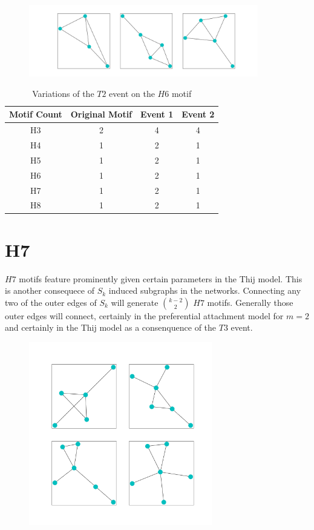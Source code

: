 \begin{figure}[!ht]
    \includegraphics[width=10cm]{Images/H6_evolution.png}
    \centering
\end{figure}
\FloatBarrier

\begin{table}
    \centering
    \begin{tabular}{||c c c c||} 
    \hline
    Motif Count & Original Motif & Event 1 & Event 2\\ [0.5ex] 
    \hline\hline
    H3 & 2 & 4 & 4\\ 
    \hline
    H4 & 1 & 2 & 1\\
    \hline
    H5 & 1 & 2 & 1\\
    \hline
    H6 & 1 & 2 & 1\\
    \hline
    H7 & 1 & 2 & 1\\
    \hline
    H8 & 1 & 2 & 1\\
    \hline
   \end{tabular}
   \caption{Variations of the $T2$ event on the $H6$ motif}
    \label{table:4}
\end{table}

\section{H7}
$H7$ motifs feature prominently given certain parameters in the Thij model. This is another consequece
of $S_k$ induced subgraphs in the networks. Connecting any two of the outer edges of $S_k$
will generate ${k-2 \choose 2}$ $H7$ motifs. Generally those outer edges will connect, certainly 
in the preferential attachment model for $m=2$ and certainly in the Thij model as a consenquence 
of the $T3$ event.

\begin{figure}[!ht]
    \includegraphics[width=8cm]{Images/H7_evolution.png}
    \centering
\end{figure}
\FloatBarrier

